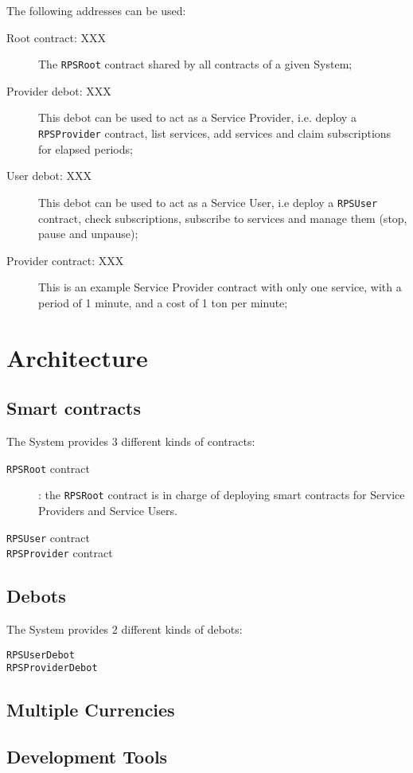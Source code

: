 \documentclass[10pt,a4paper]{article}
\begin{document}
The following addresses can be used:
\begin{description}
  \item[Root contract: XXX] The {\tt RPSRoot} contract shared by all
    contracts of a given System;
  \item[Provider debot: XXX] This debot can be used to act as a
    Service Provider, i.e. deploy a {\tt RPSProvider} contract, list
    services, add services and claim subscriptions for elapsed
    periods;
  \item[User debot: XXX] This debot can be used to act as a Service
    User, i.e deploy a {\tt RPSUser} contract, check subscriptions,
    subscribe to services and manage them (stop, pause and unpause);
  \item[Provider contract: XXX] This is an example Service Provider
    contract with only one service, with a period of 1 minute, and a
    cost of 1 ton per minute;
    
\end{description}
    
\section{Architecture}

\subsection{Smart contracts}

The System provides 3 different kinds of contracts:
\begin{description}
\item[{\tt RPSRoot} contract]: the {\tt RPSRoot} contract is in charge
  of deploying smart contracts for Service Providers and Service
  Users.
\item[{\tt RPSUser} contract]
\item[{\tt RPSProvider} contract]
\end{description}

\subsection{Debots}

The System provides 2 different kinds of debots:

\begin{description}
\item[{\tt RPSUserDebot}]
\item[{\tt RPSProviderDebot}]
\end{description}

\subsection{Multiple Currencies}

\subsection{Development Tools}
\end{document}
